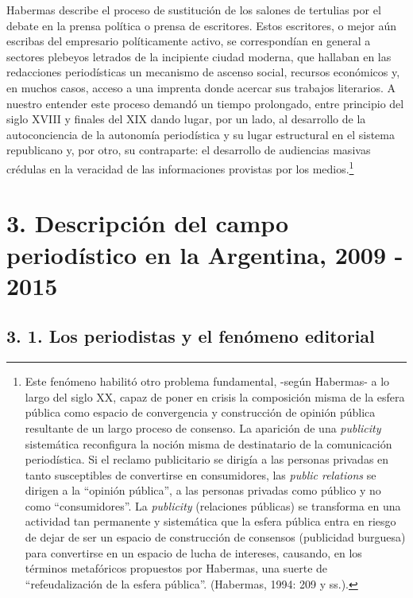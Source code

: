 {Habermas describe el proceso de sustitución de los salones de tertulias por el debate en la prensa política o prensa de escritores. Estos escritores, o mejor aún escribas del empresario políticamente activo, se correspondían en general a sectores plebeyos letrados de la incipiente ciudad moderna, que hallaban en las redacciones periodísticas un mecanismo de ascenso social, recursos económicos y, en muchos casos, acceso a una imprenta donde acercar sus trabajos literarios. A nuestro entender este proceso demandó un tiempo prolongado, entre principio del siglo XVIII y finales del XIX dando lugar, por un lado, al desarrollo de la autoconciencia de la autonomía periodística y su lugar estructural en el sistema republicano y, por otro, su contraparte: el desarrollo de audiencias masivas crédulas en la veracidad de las informaciones provistas por los medios.\footnote{Este fenómeno habilitó otro problema fundamental, -según Habermas- a lo largo del siglo XX, capaz de poner en crisis la composición misma de la esfera pública como espacio de convergencia y construcción de opinión pública resultante de un largo proceso de consenso. La aparición de una \emph{publicity} sistemática reconfigura la noción misma de destinatario de la comunicación periodística. Si el reclamo publicitario se dirigía a las personas privadas en tanto susceptibles de convertirse en consumidores, las \emph{public relations} se dirigen a la \enquote{opinión pública}, a las personas privadas como público y no como \enquote{consumidores}. La \emph{publicity} (relaciones públicas) se transforma en una actividad tan permanente y sistemática que la esfera pública entra en riesgo de dejar de ser un espacio de construcción de consensos (publicidad burguesa) para convertirse en un espacio de lucha de intereses, causando, en los términos metafóricos propuestos por Habermas, una suerte de \enquote{refeudalización de la esfera pública}. (Habermas, 1994: 209 y ss.).}

\chapter{3. Descripción del campo periodístico en la Argentina, 2009 - 2015}

\section{3. 1. Los periodistas y el fenómeno editorial}

}
